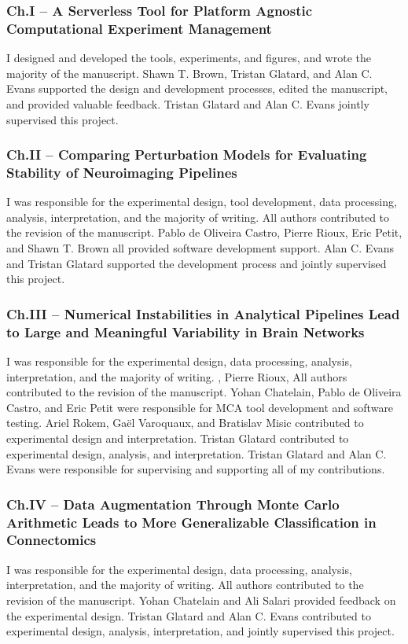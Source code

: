 \subsubsection*{Ch.I – A Serverless Tool for Platform Agnostic Computational Experiment Management}
I designed and developed the tools, experiments, and figures, and wrote the majority of the manuscript. Shawn T. Brown,
Tristan Glatard, and Alan C. Evans supported the design and development processes, edited the manuscript, and provided
valuable feedback. Tristan Glatard and Alan C. Evans jointly supervised this project.

\subsubsection*{Ch.II – Comparing Perturbation Models for Evaluating Stability of Neuroimaging Pipelines}
I was responsible for the experimental design, tool development, data processing, analysis, interpretation, and the
majority of writing. All authors contributed to the revision of the manuscript. Pablo de Oliveira Castro, Pierre Rioux,
Eric Petit, and Shawn T. Brown all provided software development support. Alan C. Evans and Tristan Glatard supported
the development process and jointly supervised this project.

\subsubsection*{Ch.III – Numerical Instabilities in Analytical Pipelines Lead to Large and Meaningful Variability in Brain
Networks}
I was responsible for the experimental design, data processing, analysis, interpretation, and the majority of writing.
, Pierre Rioux,
All authors contributed to the revision of the manuscript. Yohan Chatelain, Pablo de Oliveira Castro, and Eric Petit
were responsible for MCA tool development and software testing. Ariel Rokem, Gaël Varoquaux, and Bratislav Misic
contributed to experimental design and interpretation. Tristan Glatard contributed to experimental design, analysis,
and interpretation. Tristan Glatard and Alan C. Evans were responsible for supervising and supporting all of my
contributions.

\subsubsection*{Ch.IV – Data Augmentation Through Monte Carlo Arithmetic Leads to More Generalizable Classification in
Connectomics}
I was responsible for the experimental design, data processing, analysis, interpretation, and the majority of writing.
All authors contributed to the revision of the manuscript. Yohan Chatelain and Ali Salari provided feedback on the
experimental design. Tristan Glatard and Alan C. Evans contributed to experimental design, analysis, interpretation,
and jointly supervised this project.

\clearpage
